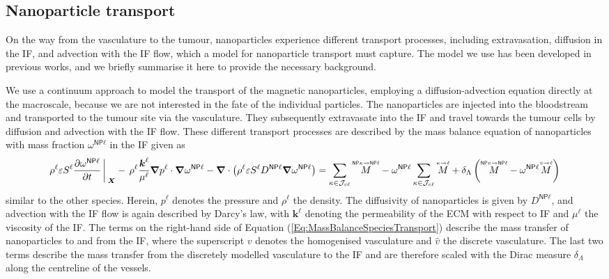 \documentclass[Times1COL,AMA]{WileyNJDv5} %
\newcommand{\vct}[1]{\boldsymbol{#1}}
\newcommand{\NP}{{\textsf{NP}}}
\newcommand{\omegaNPl}{\omega^{\textsf{NP}\ell}}
\newcommand{\soverset}[2]{\overset{\scriptscriptstyle #1}{#2}}
\begin{document}
\subsection{Nanoparticle transport}\label{sec:TransportNanoparticles}

On the way from the vasculature to the tumour, nanoparticles experience different transport processes, including extravasation, diffusion in the IF, and advection with the IF flow, which a model for nanoparticle transport must capture.
The model we use has been developed in previous works\cite{Wirthl2020,Wirthl2024,Wirthl2024a}, and we briefly summarise it here to provide the necessary background.

We use a continuum approach to model the transport of the magnetic nanoparticles, employing a diffusion-advection equation directly at the macroscale, because we are not interested in the fate of the individual particles.
The nanoparticles are injected into the bloodstream and transported to the tumour site via the vasculature.
They subsequently extravasate into the IF and travel towards the tumour cells by diffusion and advection with the IF flow.
These different transport processes are described by the mass balance equation of nanoparticles with mass fraction $\omegaNPl$ in the IF given as
\begin{equation}
    \rho^\ell \varepsilon S^\ell \frac{\partial \omegaNPl}{\partial t}
    \bigg\arrowvert_{\vct{X}}
    -\,
    \rho^\ell \frac{\vct{k}^\ell}{\mu^\ell} \vct{\nabla} p^\ell \cdot \vct{\nabla}\omegaNPl
    -
    \vct{\nabla} \cdot \left(
    \rho^\ell\varepsilon S^\ell D^{\NP\ell} \vct{\nabla} \omegaNPl
    \right)
    =
    \sum\limits_{\kappa \in \mathcal{J}_{c\ell}} \soverset{\NP\kappa \rightarrow \NP\ell}{M}
    -
    \omegaNPl \sum\limits_{\kappa \in \mathcal{J}_{c\ell}} \soverset{\kappa  \rightarrow \ell}{M}
    +
    \delta_\Lambda
    \left(
    \soverset{\NP\hat{v} \rightarrow \NP\ell}{M}
    -
    \omegaNPl \soverset{\hat{v} \rightarrow \ell}{M}
    \right)
    \label{Eq:MassBalanceSpeciesTransport}
\end{equation}
similar to the other species.
Herein, $p^\ell$ denotes the pressure and $\rho^\ell$ the density.
The diffusivity of nanoparticles is given by $D^{\NP\ell}$, and advection with the IF flow is again described by Darcy's law, with $\vct{k}^\ell$ denoting the permeability of the ECM with respect to IF and $\mu^\ell$ the viscosity of the IF.
The terms on the right-hand side of Equation (\ref{Eq:MassBalanceSpeciesTransport}) describe the mass transfer of nanoparticles to and from the IF, where the superscript $v$ denotes the homogenised vasculature and $\hat{v}$ the discrete vasculature.
The last two terms describe the mass transfer from the discretely modelled vasculature to the IF and are therefore scaled with the Dirac measure $\delta_\Lambda$ along the centreline of the vessels.
\end{document}
